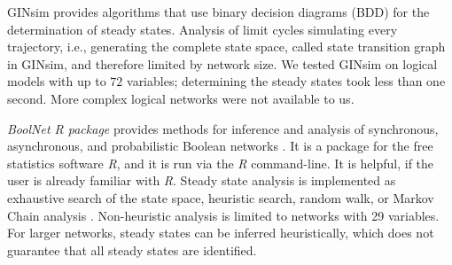 \documentclass[10pt]{bmc_article}
\newcommand{\ul}{\hi}
\newenvironment{bmcformat}{\fussy\setboolean{publ}{true}}{\fussy}
\begin{document}
\begin{bmcformat}
GINsim
provides algorithms that use binary decision diagrams (BDD) for the
determination of steady states\cite{Chaouiya}. 
Analysis of limit cycles \ul{is executed by} simulating every trajectory, i.e., generating the complete state space, called state transition graph in GINsim,
and therefore limited by network size.
We tested GINsim on logical models with up to $72$ variables; determining the
steady states took less than one second. More complex logical networks were not available to us.



{\it BoolNet R package} provides methods for inference and analysis of synchronous,
asynchronous, and probabilistic Boolean networks \cite{boolnet}. It is a
package for the free statistics software {\it R}, and it is run via the {\it R} command-line. It is helpful, if the user is already familiar with {\it R}. 
Steady state
analysis is implemented as exhaustive search of the state space, heuristic
search, random walk, or Markov Chain analysis \cite{shmulevich}. Non-heuristic analysis is limited to networks with 29 variables.
For
larger networks, steady states can be inferred heuristically, which does not guarantee that all steady states are identified. 




\end{bmcformat}
\end{document}
